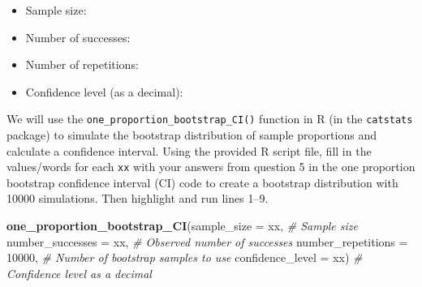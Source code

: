 \documentclass[
]{report}
\newenvironment{Shaded}{\begin{snugshade}}{\end{snugshade}}
\newcommand{\AttributeTok}[1]{\textcolor[rgb]{0.13,0.29,0.53}{#1}}
\newcommand{\CommentTok}[1]{\textcolor[rgb]{0.56,0.35,0.01}{\textit{#1}}}
\newcommand{\DecValTok}[1]{\textcolor[rgb]{0.00,0.00,0.81}{#1}}
\newcommand{\FunctionTok}[1]{\textcolor[rgb]{0.13,0.29,0.53}{\textbf{#1}}}
\newcommand{\NormalTok}[1]{#1}
\providecommand{\tightlist}{%
  \setlength{\itemsep}{0pt}\setlength{\parskip}{0pt}}
\begin{document}
\begin{itemize}
\tightlist
\item
  Sample size:
\end{itemize}

\vspace{.1in}

\begin{itemize}
\tightlist
\item
  Number of successes:
\end{itemize}

\vspace{.1in}

\begin{itemize}
\tightlist
\item
  Number of repetitions:
\end{itemize}

\vspace{.1in}

\begin{itemize}
\tightlist
\item
  Confidence level (as a decimal):
\end{itemize}

\vspace{.1in}

We will use the \texttt{one\_proportion\_bootstrap\_CI()} function in R (in the \texttt{catstats} package) to simulate the bootstrap distribution of sample proportions and calculate a confidence interval. Using the provided R script file, fill in the values/words for each \texttt{xx} with your answers from question 5 in the one proportion bootstrap confidence interval (CI) code to create a bootstrap distribution with 10000 simulations. Then highlight and run lines 1--9.

\begin{Shaded}
\begin{Highlighting}[]
\FunctionTok{one\_proportion\_bootstrap\_CI}\NormalTok{(}\AttributeTok{sample\_size =}\NormalTok{ xx, }\CommentTok{\# Sample size}
                    \AttributeTok{number\_successes =}\NormalTok{ xx, }\CommentTok{\# Observed number of successes}
                    \AttributeTok{number\_repetitions =} \DecValTok{10000}\NormalTok{, }\CommentTok{\# Number of bootstrap samples to use}
                    \AttributeTok{confidence\_level =}\NormalTok{ xx) }\CommentTok{\# Confidence level as a decimal}
\end{Highlighting}
\end{Shaded}
\end{document}
